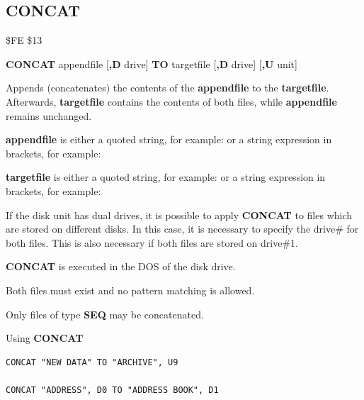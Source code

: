 
\newpage
\subsection{CONCAT}
\begin{description}[leftmargin=2cm,style=nextline]
\item [Token:]    \$FE \$13

\item [Format:]   {\bf CONCAT} appendfile [{\bf,D} drive] {\bf TO} targetfile [{\bf,D} drive] [{\bf,U} unit]

\item [Usage:]    Appends (concatenates) the contents of the {\bf appendfile} to the {\bf targetfile}. Afterwards, {\bf targetfile} contains the contents of both files, while {\bf appendfile} remains unchanged.

                  {\bf appendfile} is either a quoted string, for example:  or a string expression in brackets, for example: 

                  {\bf targetfile} is either a quoted string, for example:  or a string expression in brackets, for example: 

                  If the disk unit has dual drives, it is possible to apply {\bf CONCAT} to files which are stored on different disks. In this case, it is necessary to specify the drive\# for both files. This is also necessary if both files are stored on drive\#1.

                  \drivedefinition

                  \unitdefinition

\item [Remarks:]  {\bf CONCAT} is executed in the DOS of the disk drive.

                  Both files must exist and no pattern matching is allowed.

                  Only files of type {\bf SEQ} may be concatenated.

\item [Examples:] Using {\bf CONCAT}

\begin{tcolorbox}[colback=black,coltext=white]
\verbatimfont{\codefont}
\begin{verbatim}
CONCAT "NEW DATA" TO "ARCHIVE", U9

CONCAT "ADDRESS", D0 TO "ADDRESS BOOK", D1
\end{verbatim}
\end{tcolorbox}
\end{description}

